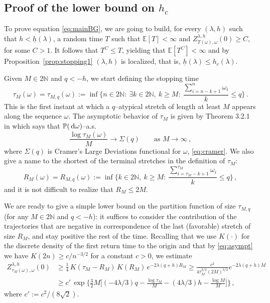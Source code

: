 \documentclass[reqno,11pt]{amsart}
\numberwithin{equation}{section}
\newcommand{\N}{\mathbb{N}}
\newcommand{\dd}{\,\text{\rm d}}             %
\newcommand{\bbE}{{\ensuremath{\mathbb E}} }
\newcommand{\bbP}{{\ensuremath{\mathbb P}} }
\newcommand{\go}{\omega}
\newcommand{\gl}{\lambda}
\newcommand{\gS}{\Sigma}
\begin{document}
\smallskip

\subsection{Proof of the lower bound on $h_c$}
\label{sec:appB2}
To prove equation \eqref{eq:mainBG}, we are going to build, for every $(\gl,h)$ such that $h < \underline h(\gl)$, a random time $T$ such that $\bbE[T]<\infty$ and $Z_{T(\go),\go}^{\gl,h}(0) \ge C$, for some $C>1$. It follows that $T^C \le T$, yielding that $\bbE[T^C]<\infty$ and by Proposition~\ref{prop:stopping1} $(\gl,h)$ is localized, that is, $\underline h(\gl) \le h_c(\gl)$.

\smallskip

Given $M\in 2\N$
and $q<-h$, we start defining the stopping time
\begin{equation}
\tau_M(\go) = \tau_{M,q}(\go) := \inf \bigg\{n\in2\N:\ \exists k \in 2\N,\ k \ge M:\ \frac{\sum_{i=n-k+1}^n \go_i}{k} \le q \bigg\}\,.
\end{equation}
This is the first instant at which a $q$--atypical stretch of length at least $M$ appears along the sequence $\go$. The asymptotic behavior of $\tau_M$ is given by Theorem 3.2.1 in \cite[\S~3.2]{cf:DZ} which says that $\bbP(\dd\go)$--a.s.
\begin{equation} \label{eq:as_tau}
\frac{\log \tau_{M}(\go)}{M} \to \gS(q) \qquad \text{as } M\to\infty\,,
\end{equation}
where $\gS(q)$ is Cramer's Large Deviations functional for $\go$, \eqref{eq:cramer}.
We also give a name to the shortest of the terminal stretches in the definition of $\tau_M$:
\begin{equation}
R_{M}(\go) = R_{M,q}(\go) := \inf \bigg\{k \in 2\N,\ k \ge M:\ \frac{\sum_{i=\tau_M-k+1}^{\tau_M} \go_i}{k} \le q \bigg\}\,,
\end{equation}
and it is not difficult to realize that $R_M \le 2M$.


\smallskip

We are ready to give a simple lower bound on the partition function of size $\tau_{M,q}$ (for any $M\in 2\N$ and $q<-h$): it suffices to consider the contribution of the trajectories that are negative in correspondence of the last (favorable) stretch of size $R_M$, and stay positive the rest of the time. Recalling that
we use $K(\cdot)$ for the discrete density of the first return time to the origin and that by
\eqref{eq:asympt} we have $K(2n)\ge c/n^{-3/2}$ for a constant $c>0$,
we estimate
\begin{equation}\begin{split}
Z_{\tau_M(\go), \go}^{\gl,h}(0) & \ge \frac 1 4 \, K\left({\tau_M - R_M}\right) \, K\left(
{R_M}\right) \, e^{-2\gl (q+h) R_M} \ge \frac{c^2}{4 \tau_M^{3/2} (2M)^{3/2}} e^{-2\gl (q+h) M} \\
& \ge c'\, \exp \bigg\{ \frac 3 2 M \bigg[ (-4\gl /3)q - \frac{\log \tau_M}{M} - ( 4 \gl/3) h - \frac{\log M}{M} \bigg] \bigg\} \,,
\end{split}\end{equation}
where $c' := c^2/(8\sqrt{2})$.
\end{document}
